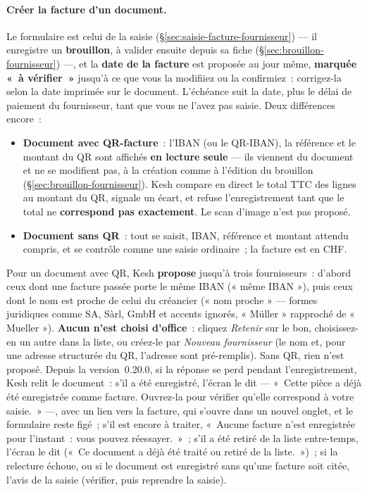 \documentclass[a4paper,11pt,oneside]{article}
\begin{document}
\paragraph{Créer la facture d'un document.} Le formulaire est celui de la saisie
(\S\ref{sec:saisie-facture-fournisseur}) --- il enregistre un \textbf{brouillon}, à valider
ensuite depuis sa fiche (\S\ref{sec:brouillon-fournisseur}) ---, et la \textbf{date de la
facture} est proposée au jour même, \textbf{marquée «~à vérifier~»} jusqu'à ce que vous la
modifiiez ou la confirmiez~: corrigez-la selon la date imprimée sur le document. L'échéance suit
la date, plus le délai de paiement du fournisseur, tant que vous ne l'avez pas saisie. Deux différences encore~:
\begin{itemize}
    \item \textbf{Document avec QR-facture}~: l'IBAN (ou le QR-IBAN), la référence et le
          montant du QR sont affichés \textbf{en lecture seule} --- ils viennent du
          document et ne se modifient pas, à la création comme à l'édition du brouillon
          (\S\ref{sec:brouillon-fournisseur}). Kesh compare en direct le total TTC des lignes
          au montant du QR, signale un écart, et refuse l'enregistrement tant que le total
          ne \textbf{correspond pas exactement}. Le scan d'image n'est pas proposé.
    \item \textbf{Document sans QR}~: tout se saisit, IBAN, référence et montant attendu
          compris, et se contrôle comme une saisie ordinaire~; la facture est en CHF.
\end{itemize}
Pour un document avec QR, Kesh \textbf{propose} jusqu'à trois fournisseurs~: d'abord ceux
dont une facture passée porte le même IBAN (« même IBAN »), puis ceux dont le nom est
proche de celui du créancier (« nom proche » --- formes juridiques comme SA, Sàrl, GmbH et
accents ignorés, « Müller » rapproché de « Mueller »). \textbf{Aucun n'est choisi d'office}~:
cliquez \emph{Retenir} sur le bon, choisissez-en un autre dans la liste, ou créez-le par
\emph{Nouveau fournisseur} (le nom et, pour une adresse structurée du QR, l'adresse sont
pré-remplis). Sans QR, rien n'est proposé. Depuis la version~0.20.0, si la réponse se perd
pendant l'enregistrement, Kesh relit le document~: s'il a été enregistré, l'écran le dit ---
«~Cette pièce a déjà été enregistrée comme facture. Ouvrez-la pour vérifier qu'elle correspond à
votre saisie.~» ---, avec un lien vers la facture, qui s'ouvre dans un nouvel onglet, et le
formulaire reste figé~; s'il est encore à traiter, «~Aucune facture n'est enregistrée pour
l'instant~: vous pouvez réessayer.~»~; s'il a été retiré de la liste entre-temps, l'écran le dit
(«~Ce document a déjà été traité ou retiré de la liste.~»)~; si la relecture échoue, ou si le
document est enregistré sans qu'une facture soit citée, l'avis de la saisie (vérifier, puis
reprendre la saisie).
\end{document}
